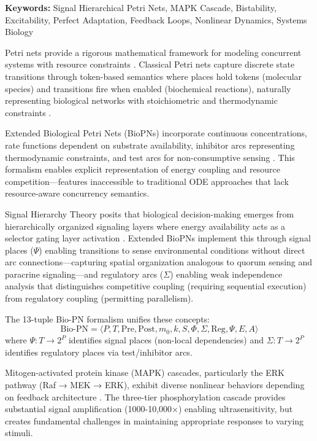 \documentclass[twocolumn,11pt]{article}
\begin{document}
\textbf{Keywords:} Signal Hierarchical Petri Nets, MAPK Cascade, Bistability, Excitability, Perfect Adaptation, Feedback Loops, Nonlinear Dynamics, Systems Biology

Petri nets provide a rigorous mathematical framework for modeling concurrent systems with resource constraints \citep{petri1962, chaouiya2007}. Classical Petri nets capture discrete state transitions through token-based semantics where places hold tokens (molecular species) and transitions fire when enabled (biochemical reactions), naturally representing biological networks with stoichiometric and thermodynamic constraints \citep{heiner2008}.

Extended Biological Petri Nets (BioPNs) incorporate continuous concentrations, rate functions dependent on substrate availability, inhibitor arcs representing thermodynamic constraints, and test arcs for non-consumptive sensing \citep{simao2025unified}. This formalism enables explicit representation of energy coupling and resource competition—features inaccessible to traditional ODE approaches that lack resource-aware concurrency semantics.

Signal Hierarchy Theory posits that biological decision-making emerges from hierarchically organized signaling layers where energy availability acts as a selector gating layer activation \citep{simao2025weak, eugenio2025}. Extended BioPNs implement this through signal places ($\Psi$) enabling transitions to sense environmental conditions without direct arc connections—capturing spatial organization analogous to quorum sensing and paracrine signaling—and regulatory arcs ($\Sigma$) enabling weak independence analysis that distinguishes competitive coupling (requiring sequential execution) from regulatory coupling (permitting parallelism).

The 13-tuple Bio-PN formalism unifies these concepts:
{\small
\begin{equation}
\text{Bio-PN} = \langle P, T, \text{Pre}, \text{Post}, m_0, k, S, \Phi, \Sigma, \text{Reg}, \Psi, E, A \rangle
\end{equation}
}
where $\Psi: T \to 2^P$ identifies signal places (non-local dependencies) and $\Sigma: T \to 2^P$ identifies regulatory places via test/inhibitor arcs.

Mitogen-activated protein kinase (MAPK) cascades, particularly the ERK pathway (Raf → MEK → ERK), exhibit diverse nonlinear behaviors depending on feedback architecture \citep{kholodenko2000, ferrell1996}. The three-tier phosphorylation cascade provides substantial signal amplification (1000-10,000×) enabling ultrasensitivity, but creates fundamental challenges in maintaining appropriate responses to varying stimuli.
\end{document}
